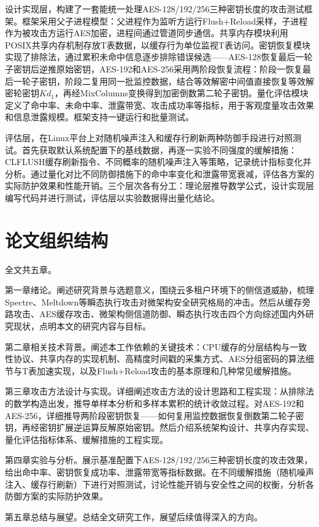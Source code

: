 设计实现层，构建了一套能统一处理AES-128/192/256三种密钥长度的攻击测试框架。框架采用父子进程模型：父进程作为监听方运行Flush+Reload采样，子进程作为被攻击方运行AES加密，进程间通过管道同步通信。共享内存模块利用POSIX共享内存机制存放T表数据，以缓存行为单位监视T表访问。密钥恢复模块实现了排除法，通过累积未命中信息逐步排除错误候选——AES-128恢复最后一轮子密钥后逆推原始密钥，AES-192和AES-256采用两阶段恢复流程：阶段一恢复最后一轮子密钥，阶段二复用同一批监控数据，结合等效解密中间值直接恢复等效解密轮密钥$Kd_1$，再经MixColumns变换得到加密倒数第二轮子密钥。量化评估模块定义了命中率、未命中率、泄露带宽、攻击成功率等指标，用于客观度量攻击效果和信息泄露规模。框架支持一键运行和批量测试。

评估层，在Linux平台上对随机噪声注入和缓存行刷新两种防御手段进行对照测试。首先获取默认系统配置下的基线数据，再逐一实验不同强度的缓解措施：CLFLUSH缓存刷新指令、不同概率的随机噪声注入等策略，记录统计指标变化并分析。通过量化对比不同防御措施下的命中率变化和泄露带宽衰减，评估各方案的实际防护效果和性能开销。三个层次各有分工：理论层推导数学公式，设计实现层编写代码并进行测试，评估层以实验数据得出量化结论。

\section{论文组织结构}

全文共五章。

第一章绪论。阐述研究背景与选题意义，围绕云多租户环境下的侧信道威胁，梳理Spectre、Meltdown等瞬态执行攻击对微架构安全研究格局的冲击。然后从缓存旁路攻击、AES缓存攻击、微架构侧信道防御、瞬态执行攻击四个方向综述国内外研究现状，点明本文的研究内容与目标。

第二章相关技术背景。阐述本工作依赖的关键技术：CPU缓存的分层结构与一致性协议、共享内存的实现机制、高精度时间戳的采集方式、AES分组密码的算法细节与T表加速实现，以及Flush+Reload攻击的基本原理和几种常见缓解措施。

第三章攻击方法设计与实现。详细阐述攻击方法的设计思路和工程实现：从排除法的数学构造出发，推导单样本分析和多样本累积的统计收敛过程。对AES-192和AES-256，详细推导两阶段密钥恢复——如何复用监控数据恢复倒数第二轮子密钥，再经密钥扩展逆运算反解原始密钥。然后介绍系统架构设计、共享内存实现、量化评估指标体系、缓解措施的工程实现。

第四章实验与分析。展示基准配置下AES-128/192/256三种密钥长度的攻击效果，给出命中率、密钥恢复成功率、泄露带宽等指标数据。在不同缓解措施（随机噪声注入、缓存行刷新）下进行对照测试，讨论性能开销与安全性之间的权衡，分析各防御方案的实际防护效果。

第五章总结与展望。总结全文研究工作，展望后续值得深入的方向。
